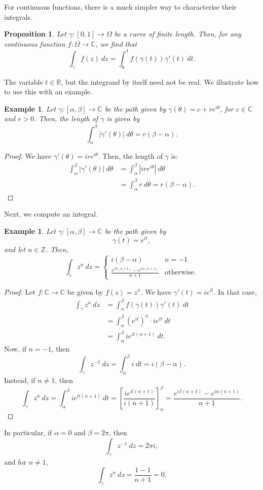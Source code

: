 \documentclass[a4paper, openany]{memoir}
\theoremstyle{definition}
\theoremstyle{plain}
\newtheorem{proposition}[definition]{Proposition}
\newtheorem{example}[definition]{Example}
\begin{document}
For continuous functions, there is a much simpler way to characterise their integrals.
\begin{proposition}
Let $\gamma: [0, 1] \to \Omega$ be a curve of finite length. Then, for any continuous function $f: \Omega \to \mathbb{C}$, we find that
\[\int_\gamma f(z) \ dz = \int_0^1 f(\gamma(t)) \gamma'(t) \ dt.\]
\end{proposition}
\noindent The variable $t \in \mathbb{R}$, but the integrand by itself need not be real. We illustrate how to use this with an example.
\begin{example}
Let $\gamma: [\alpha, \beta] \to \mathbb{C}$ be the path given by $\gamma(\theta) = c + re^{i \theta}$, for $c \in \mathbb{C}$ and $r > 0$. Then, the length of $\gamma$ is given by
\[\int_\alpha^\beta |\gamma'(\theta)| \ d\theta = r(\beta - \alpha).\]
\end{example}
\begin{proof}
We have $\gamma'(\theta) = ire^{i \theta}$. Then, the length of $\gamma$ is:
\begin{align*}
    \int_\alpha^\beta |\gamma'(\theta)| \ d\theta &= \int_\alpha^\beta |ir e^{i \theta}| \ d\theta \\
    &= \int_\alpha^\beta r \ d\theta =  r(\beta - \alpha).
\end{align*}
\end{proof}
Next, we compute an integral.
\begin{example}
Let $\gamma: [\alpha, \beta] \to \mathbb{C}$ be the path given by
\[\gamma(t) = e^{it},\]
and let $n \in \mathbb{Z}$. Then,
\[\int_\gamma z^n \ dz = \begin{cases}
i(\beta - \alpha) & n = -1 \\
\frac{e^{i\beta(n+1)} - e^{i\alpha(n+1)}}{n+1} & \text{otherwise}.
\end{cases}\]
\end{example}
\begin{proof}
Let $f: \mathbb{C} \to \mathbb{C}$ be given by $f(z) = z^n$. We have $\gamma'(t) = ie^{it}$. 
In that case,
\begin{align*}
    \int_\gamma z^n \ dz &= \int_\alpha^\beta f(\gamma(t)) \gamma'(t) \ dt \\
    &= \int_\alpha^\beta (e^{it})^n \cdot ie^{it} \ dt \\
    &= \int_\alpha^\beta ie^{it(n+1)} \ dt.
\end{align*}
Now, if $n = -1$, then
\[\int_\gamma z^{-1} \ dz = \int_\alpha^\beta i \ dt = i(\beta - \alpha).\]
Instead, if $n \neq 1$, then
\[\int_\gamma z^n \ dz = \int_\alpha^\beta ie^{it(n+1)} \ dt = \left[\frac{ie^{it(n+1)}}{i(n+1)}\right]_\alpha^\beta = \frac{e^{i\beta(n+1)} - e^{i\alpha(n+1)}}{n+1}.\]
\end{proof}
\noindent In particular, if $\alpha = 0$ and $\beta = 2\pi$, then
\[\int_\gamma z^{-1} \ dz = 2\pi i,\]
and for $n \neq 1$,
\[\int_\gamma z^n \ dz = \frac{1 - 1}{n+1} = 0.\]
\end{document}
